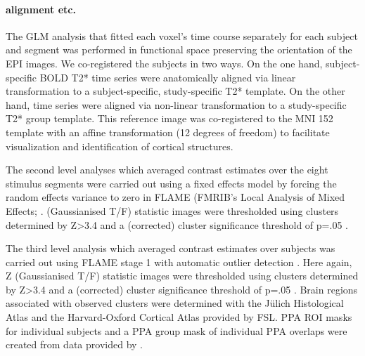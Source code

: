 \documentclass[english]{article}
\begin{document}
\paragraph{alignment etc.}
The GLM analysis that fitted each voxel's time course separately for each
subject and segment was performed in functional space preserving the orientation
of the EPI images.
We co-registered the subjects in two ways.
On the one hand, subject-specific BOLD T2* time series were anatomically aligned
via linear transformation to a subject-specific, study-specific T2* template.
On the other hand, time series were aligned via non-linear transformation to a
study-specific T2* group template.
This reference image was co-registered to the MNI 152 template with an affine
transformation (12 degrees of freedom) to facilitate visualization and
identification of cortical structures.

The second level analyses which averaged contrast estimates over the eight
stimulus segments were carried out using a fixed effects model by forcing the
random effects variance to zero in FLAME (FMRIB's Local Analysis of Mixed
Effects; \citep{beckmann2003general, woolrich2004multilevel}.
(Gaussianised T/F) statistic images were thresholded using clusters determined
by Z>3.4 and a (corrected) cluster significance threshold of p=.05
\citep{worsley2001statistical}.

The third level analysis which averaged contrast estimates over subjects was
carried out using FLAME stage 1 with automatic outlier detection
\citep{beckmann2003general, woolrich2004multilevel, woolrich2008robust}.
Here again, Z (Gaussianised T/F) statistic images were thresholded using
clusters determined by Z>3.4 and a (corrected) cluster significance threshold of
p=.05 \citep{worsley2001statistical}.
Brain regions associated with observed clusters were determined with the Jülich
Histological Atlas \citep{eickhoff2005toolbox, eickhoff2007assignment} and the
Harvard-Oxford Cortical Atlas \citep{desikan2006automated} provided by FSL.
PPA ROI masks for individual subjects and a PPA group mask of individual PPA
overlaps were created from data provided by \citep{sengupta2016extension}.
\end{document}

